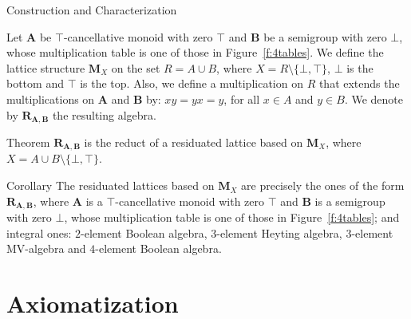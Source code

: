 \documentclass[professionalfont, 12pt]{beamer} %
\theoremstyle{plain}
\theoremstyle{definition}
\begin{document}
\begin{frame}{Construction and Characterization}

Let $\mathbf{A}$ be $\top$-cancellative monoid with zero $\top$ and $\mathbf{B}$ be a semigroup with zero $\bot$, whose multiplication table is one of those in Figure~\ref{f:4tables}.\pause
We define the lattice structure $\mathbf{M}_X$ on the set $R = A \cup B$, where $X = R \setminus \{\bot, \top\}$, $\bot$ is the bottom and $\top$ is the top. \pause
Also, we define a multiplication on $R$ that extends the multiplications on $\mathbf{A}$ and $\mathbf{B}$ by: $xy = yx = y$, for all $x \in A$ and $y \in B$.
We denote by $\mathbf{R}_{\mathbf{A}, \mathbf{B}}$ the resulting algebra.
\end{frame}

\begin{frame}
\begin{block}{Theorem}
    $\mathbf{R}_{\mathbf{A}, \mathbf{B}}$ is the reduct of a residuated lattice based on $\mathbf{M}_X$, where $X = A \cup B \setminus \{\bot, \top\}$.
\end{block}
\pause

\begin{block}{Corollary}
    The residuated lattices based on $\mathbf{M}_X$ are precisely the ones of the form $\mathbf{R}_{\mathbf{A}, \mathbf{B}}$, where $\mathbf{A}$ is a $\top$-cancellative monoid with zero $\top$ and $\mathbf{B}$ is a semigroup with zero $\bot$, whose multiplication table is one of those in Figure~\ref{f:4tables}; and integral ones: $2$-element Boolean algebra, $3$-element Heyting algebra, $3$-element MV-algebra and $4$-element Boolean algebra.
\end{block}
\end{frame}

\section{Axiomatization}
\end{document}
